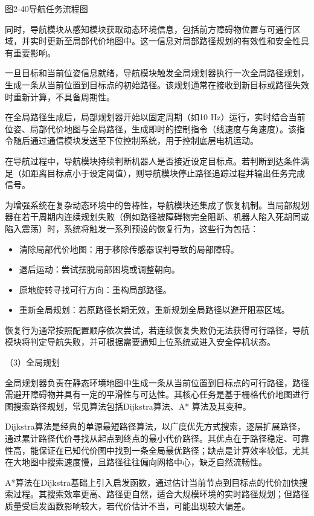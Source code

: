 \protect{}\label{_Ref201344461}{}图2-40导航任务流程图

同时，导航模块从感知模块获取动态环境信息，包括前方障碍物位置与可通行区域，并实时更新至局部代价地图中。这一信息对局部路径规划的有效性和安全性具有重要影响。

一旦目标和当前位姿信息就绪，导航模块触发全局规划器执行一次全局路径规划，生成一条从当前位置到目标点的初始路径。该规划通常在接收到新目标或路径失效时重新计算，不具备周期性。

在全局路径生成后，局部规划器开始以固定周期（如10
Hz）运行，实时结合当前位姿、局部代价地图与全局路径，生成即时的控制指令（线速度与角速度）。该指令随后通过通信模块发送至下位控制系统，用于控制底层电机运动。

在导航过程中，导航模块持续判断机器人是否接近设定目标点。若判断到达条件满足（如距离目标点小于设定阈值），则导航模块停止路径追踪过程并输出任务完成信号。

为增强系统在复杂动态环境中的鲁棒性，导航模块还集成了恢复机制。当局部规划器在若干周期内连续规划失败（例如路径被障碍物完全阻断、机器人陷入死胡同或陷入震荡）时，系统将触发一系列预设的恢复行为，这些行为包括：

\begin{itemize}
\item
  清除局部代价地图：用于移除传感器误判导致的局部障碍。
\item
  退后运动：尝试摆脱局部困境或调整朝向。
\item
  原地旋转寻找可行方向：重构局部路径。
\item
  重新全局规划：若原路径长期无效，重新规划全局路径以避开阻塞区域。
\end{itemize}

恢复行为通常按照配置顺序依次尝试，若连续恢复失败仍无法获得可行路径，导航模块将判定导航失败，并可根据需要通知上位系统或进入安全停机状态。

（3）全局规划

全局规划器负责在静态环境地图中生成一条从当前位置到目标点的可行路径，路径需避开障碍物并具有一定的平滑性与可达性。其核心任务是基于栅格代价地图进行图搜索路径规划，常见算法包括Dijkstra算法、A*
算法及其变种。

Dijkstra算法是经典的单源最短路径算法，以广度优先方式搜索，逐层扩展路径，通过累计路径代价寻找从起点到终点的最小代价路径。其优点在于路径稳定、可靠性高，能保证在已知代价图中找到一条全局最优路径；缺点是计算效率较低，尤其在大地图中搜索速度慢，且路径往往偏向网格中心，缺乏自然流畅性。

A*算法在Dijkstra基础上引入启发函数，通过估计当前节点到目标点的代价加快搜索过程。其搜索效率更高、路径更自然，适合大规模环境的实时路径规划；但路径质量受启发函数影响较大，若代价估计不当，可能出现较大偏差。

